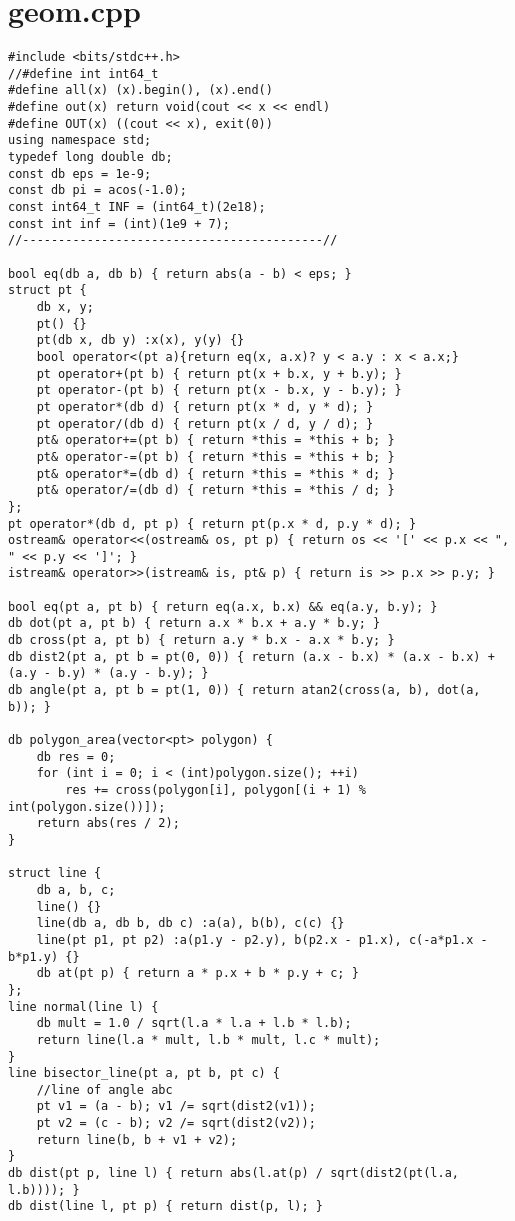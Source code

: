 \documentclass[a4paper,12pt]{report}
\begin{document}
\section{geom.cpp}
\begin{lstlisting}
#include <bits/stdc++.h>
//#define int int64_t
#define all(x) (x).begin(), (x).end()
#define out(x) return void(cout << x << endl)
#define OUT(x) ((cout << x), exit(0))
using namespace std;
typedef long double db;
const db eps = 1e-9;
const db pi = acos(-1.0);
const int64_t INF = (int64_t)(2e18);
const int inf = (int)(1e9 + 7);
//------------------------------------------//

bool eq(db a, db b) { return abs(a - b) < eps; }
struct pt {
    db x, y;
    pt() {}
    pt(db x, db y) :x(x), y(y) {}
    bool operator<(pt a){return eq(x, a.x)? y < a.y : x < a.x;}
    pt operator+(pt b) { return pt(x + b.x, y + b.y); }
    pt operator-(pt b) { return pt(x - b.x, y - b.y); }
    pt operator*(db d) { return pt(x * d, y * d); }
    pt operator/(db d) { return pt(x / d, y / d); }
    pt& operator+=(pt b) { return *this = *this + b; }
    pt& operator-=(pt b) { return *this = *this + b; }
    pt& operator*=(db d) { return *this = *this * d; }
    pt& operator/=(db d) { return *this = *this / d; }
};
pt operator*(db d, pt p) { return pt(p.x * d, p.y * d); }
ostream& operator<<(ostream& os, pt p) { return os << '[' << p.x << ", " << p.y << ']'; }
istream& operator>>(istream& is, pt& p) { return is >> p.x >> p.y; }

bool eq(pt a, pt b) { return eq(a.x, b.x) && eq(a.y, b.y); }
db dot(pt a, pt b) { return a.x * b.x + a.y * b.y; }
db cross(pt a, pt b) { return a.y * b.x - a.x * b.y; }
db dist2(pt a, pt b = pt(0, 0)) { return (a.x - b.x) * (a.x - b.x) + (a.y - b.y) * (a.y - b.y); }
db angle(pt a, pt b = pt(1, 0)) { return atan2(cross(a, b), dot(a, b)); }

db polygon_area(vector<pt> polygon) {
    db res = 0;
    for (int i = 0; i < (int)polygon.size(); ++i)
        res += cross(polygon[i], polygon[(i + 1) % int(polygon.size())]);
    return abs(res / 2);
}

struct line {
    db a, b, c;
    line() {}
    line(db a, db b, db c) :a(a), b(b), c(c) {}
    line(pt p1, pt p2) :a(p1.y - p2.y), b(p2.x - p1.x), c(-a*p1.x - b*p1.y) {}
    db at(pt p) { return a * p.x + b * p.y + c; }
};
line normal(line l) {
    db mult = 1.0 / sqrt(l.a * l.a + l.b * l.b);
    return line(l.a * mult, l.b * mult, l.c * mult);
}
line bisector_line(pt a, pt b, pt c) {
    //line of angle abc
    pt v1 = (a - b); v1 /= sqrt(dist2(v1));
    pt v2 = (c - b); v2 /= sqrt(dist2(v2));
    return line(b, b + v1 + v2);
}
db dist(pt p, line l) { return abs(l.at(p) / sqrt(dist2(pt(l.a, l.b)))); }
db dist(line l, pt p) { return dist(p, l); }



\end{lstlisting}
\end{document}
